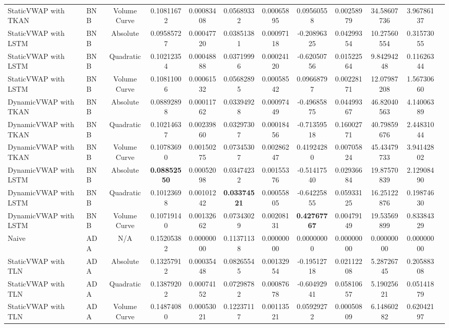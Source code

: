 \begin{table}[H]
{\begin{tabular}{llcccccccccc}
        StaticVWAP with TKAN & BNB & Volume Curve & 0.10811672 & 0.00083408 & 0.05689332 & 0.00065895 & 0.09560558 & 0.00258979 & 34.58607736 & 3.96786137 \\
        StaticVWAP with LSTM & BNB & Absolute & 0.09585727 & 0.00047720 & 0.03851381 & 0.00097118 & -0.20896325 & 0.04299354 & 10.27560554 & 0.31573055 \\
        StaticVWAP with LSTM & BNB & Quadratic & 0.10212354 & 0.00048888 & 0.03719996 & 0.00024120 & -0.62050756 & 0.01522564 & 9.84294248 & 0.11626344 \\
        StaticVWAP with LSTM & BNB & Volume Curve & 0.10811006 & 0.00061532 & 0.05682895 & 0.00058542 & 0.09668797 & 0.00228171 & 12.07987208 & 1.56730660 \\
        DynamicVWAP with TKAN & BNB & Absolute & 0.08892898 & 0.00011762 & 0.03394928 & 0.00097449 & -0.49685875 & 0.04499367 & 46.82040563 & 4.14006389 \\
        DynamicVWAP with TKAN & BNB & Quadratic & 0.10214637 & 0.00239860 & 0.03297307 & 0.00018456 & -0.71359518 & 0.16002771 & 40.79859676 & 2.44831044 \\
        DynamicVWAP with TKAN & BNB & Volume Curve & 0.10783690 & 0.00150275 & 0.07345307 & 0.00286247 & 0.41924280 & 0.00705824 & 45.43479733 & 3.94142802 \\
        DynamicVWAP with LSTM & BNB & Absolute & \textbf{0.08852550} & 0.00052098 & 0.03474232 & 0.00155376 & -0.51417540 & 0.02936684 & 19.87570839 & 2.12908490 \\
        DynamicVWAP with LSTM & BNB & Quadratic & 0.10123698 & 0.00101242 & \textbf{0.03374521} & 0.00055805 & -0.64225855 & 0.05933125 & 16.25122876 & 0.19874630 \\
        DynamicVWAP with LSTM & BNB & Volume Curve & 0.10719140 & 0.00132662 & 0.07343029 & 0.00208131 & \textbf{0.42767767} & 0.00479149 & 19.53569899 & 0.83384329 \\
        \hline
        Naive & ADA & N/A & 0.15205382 & 0.00000000 & 0.11371138 & 0.00000000 & 0.00000000 & 0.00000000 & 0.00000000 & 0.00000000 \\
        StaticVWAP with TLN & ADA & Absolute & 0.13257912 & 0.00035448 & 0.08265545 & 0.00132954 & -0.19512718 & 0.02112208 & 5.28726745 & 0.20588308 \\
        StaticVWAP with TLN & ADA & Quadratic & 0.13879202 & 0.00074152 & 0.07298782 & 0.00087678 & -0.60492941 & 0.05810657 & 5.19025621 & 0.05141879 \\
        StaticVWAP with TLN & ADA & Volume Curve & 0.14874080 & 0.00053021 & 0.12237117 & 0.00113521 & 0.05929272 & 0.00050809 & 6.14860282 & 0.62042197 \\

\end{tabular}}
\end{table}
